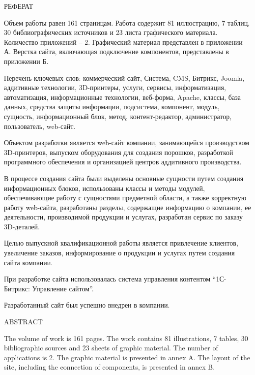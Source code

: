 \newpage
\begin{center}
  РЕФЕРАТ
\end{center}

Объем работы равен 161 страницам. Работа содержит 81 иллюстрацию, 7 таблиц, 30 библиографических источников и 23 листа графического материала. Количество приложений – 2. Графический материал представлен в приложении А. Верстка сайта, включающая подключение компонентов, представлены в приложении Б.

Перечень ключевых слов: коммерческий сайт, Система, CMS, Битрикс, Joomla, аддитивные технологии, 3D-принтеры, услуги, сервисы, информатизация, автоматизация, информационные технологии, веб-форма,  Apache, классы, база данных, средства защиты информации, подсистема, компонент, модуль, сущность, информационный блок, метод, контент-редактор, администратор, пользователь, web-сайт.

Объектом разработки является web-сайт компании,  занимающейся \linebreak производством 3D-принтеров, выпуском оборудования для создания порошков, разработкой программного обеспечения и организацией центров аддитивного производства.

В процессе создания сайта были выделены основные сущности путем создания информационных блоков, использованы классы и методы модулей, обеспечивающие работу с сущностями предметной области, а также корректную работу web-сайта, разработаны разделы, содержащие информацию о компании, ее деятельности, производимой продукции и услугах, разработан сервис по заказу 3D-деталей.

Целью выпускной квалификационной работы является \linebreak привлечение клиентов, увеличение заказов, информирование о продукции и услугах путем создания сайта компании.

При разработке сайта использовалась система управления контентом ``1С-Битрикс: Управление сайтом''.

Разработанный сайт был успешно внедрен в компании.
\newpage
{}
\begin{center}ABSTRACT\end{center}
  
The volume of work is 161 pages. The work contains 81 illustrations, 7 tables, 30 bibliographic sources and 23 sheets of graphic material. The number of applications is 2. The graphic material is presented in annex A. The layout of the site, including the connection of components, is presented in annex B.

